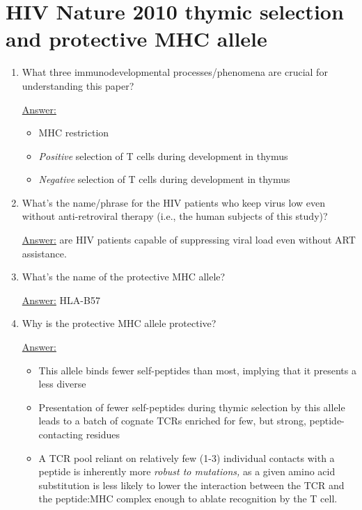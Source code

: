 \documentclass{article}
\newenvironment{QandA}{\begin{enumerate}[label=\bfseries Q\arabic*.]}
                       {\end{enumerate}}
\newenvironment{answered}{\par\normalfont\underline{Answer:}}{}
\begin{document}
\section{HIV Nature 2010 thymic selection and protective MHC allele}
\begin{QandA}
  \item{What three immunodevelopmental processes/phenomena are crucial for understanding this paper?}
    \begin{answered}
    \begin{itemize}
      \item{MHC restriction}
      \item{\textit{Positive} selection of T cells during development in thymus}
      \item{\textit{Negative} selection of T cells during development in thymus}
    \end{itemize}
    \end{answered}
  \item{What's the name/phrase for the HIV patients who keep virus low even without anti-retroviral therapy (i.e., the human subjects of this study)?}
    \begin{answered}
     are HIV patients capable of suppressing viral load even without ART assistance.
    \end{answered}
  \item{What's the name of the protective MHC allele?}
    \begin{answered}
    HLA-B57
    \end{answered}
  \item{Why is the protective MHC allele protective?}
    \begin{answered}
    \begin{itemize}
      \item{This allele binds fewer self-peptides than most, implying that it presents a less diverse}
      \item{Presentation of fewer self-peptides during thymic selection by this allele leads to a batch of cognate TCRs enriched for few, but strong, peptide-contacting residues}
      \item{A TCR pool reliant on relatively few (1-3) individual contacts with a peptide is inherently more \textit{robust to mutations,} as a given amino acid substitution is less likely to lower the interaction between the TCR and the peptide:MHC complex enough to ablate recognition by the T cell.}
    \end{itemize}
    \end{answered}

\end{QandA}
\end{document}
